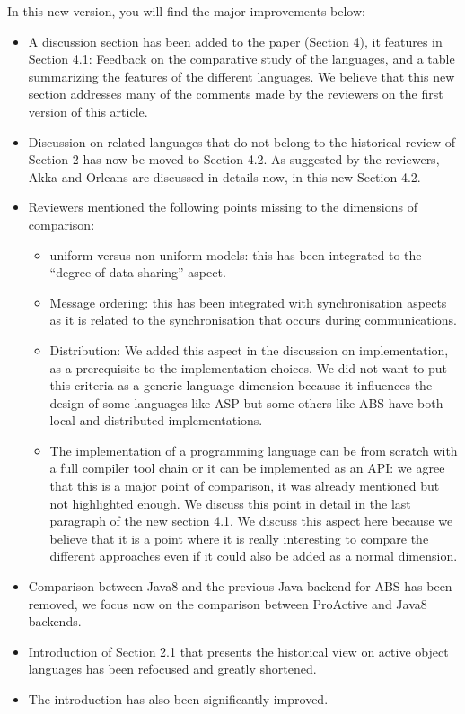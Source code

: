 \documentclass{article}
\begin{document}
In this new version, you will find the major improvements below:
\begin{itemize}
\item A discussion section has been added to the paper (Section 4), it features in 
Section 4.1: Feedback on the 
comparative study of the languages, and a table summarizing the features of the different 
languages. We believe that this new section addresses many of the comments made by the 
reviewers on the first version of this article.
\item Discussion on  related languages that do not belong to the historical review of 
Section 2 has 
now be moved to Section 4.2. As suggested by the reviewers, Akka and Orleans are 
discussed in details now, in this new Section 4.2.
\item Reviewers mentioned the following points missing to the dimensions of comparison: 
\begin{itemize}
\item uniform versus non-uniform models: this has been integrated to the ``degree of data 
sharing'' aspect.
\item Message ordering: this has been integrated with synchronisation aspects as it is 
related to the synchronisation that occurs during communications.
\item Distribution: We added this aspect in the discussion on implementation, as a 
prerequisite to the implementation choices. We did not want to put this criteria as a 
generic language dimension because it influences the design of some languages like ASP 
but some 
others like ABS have both local and distributed implementations.
\item The implementation of a programming language can be from scratch with a full 
compiler tool chain or it can be implemented as an API: we agree that this is a major 
point of comparison, it was already mentioned but not highlighted enough. We discuss this 
point in detail in the last paragraph of the new section 4.1. We discuss this aspect here 
because we believe that it is a point where it is really interesting to compare the 
different approaches even if it could also be added as a normal dimension.
\end{itemize}

\item Comparison between Java8 and the previous Java backend for ABS has been removed, we 
focus now on the comparison between ProActive and Java8 backends.
\end{itemize}
\begin{itemize}
	\item Introduction of Section 2.1 that presents the historical view on active object 
	languages has been refocused and greatly shortened.
\item The introduction has also been significantly improved.
\end{itemize}
\end{document}
